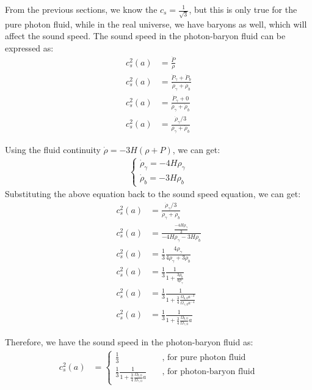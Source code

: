 \clearpage
\begin{foundation}
    From the previous sections, we know the $c_s = \frac{1}{\sqrt{3}}$, but this is only true for the pure photon fluid, while in the real universe, we have baryons as well, which will affect the sound speed. The sound speed in the photon-baryon fluid can be expressed as:
    \begin{align*}
        c_s^2(a) &= \frac{\dot{P}}{\dot{\rho}} \\
        c_s^2(a) &= \frac{\dot{P}_\gamma + \dot{P}_b}{\dot{\rho}_\gamma + \dot{\rho}_b} \\
        c_s^2(a) &= \frac{\dot{P}_\gamma + 0}{\dot{\rho}_\gamma + \dot{\rho}_b} \\
        c_s^2(a) &= \frac{\dot{\rho}_\gamma / 3}{\dot{\rho}_\gamma + \dot{\rho}_b}
    \end{align*}

    Using the fluid continuity $\dot{\rho} = -3 H (\rho + P)$, we can get:
    \begin{align*}
        \begin{cases}
            \dot{\rho}_\gamma = -4 H \rho_\gamma \\
            \dot{\rho}_b = -3 H \rho_b
        \end{cases}
    \end{align*}
    Substituting the above equation back to the sound speed equation, we can get:
    \begin{align*}
        c_s^2(a) &= \frac{\dot{\rho}_\gamma / 3}{\dot{\rho}_\gamma + \dot{\rho}_b} \\
        c_s^2(a) &= \frac{\frac{-4 H \rho_\gamma}{3}}{-4 H \rho_\gamma - 3 H \rho_b} \\
        c_s^2(a) &= \frac{1}{3} \frac{4 \rho_\gamma}{4 \rho_\gamma + 3 \rho_b} \\
        c_s^2(a) &= \frac{1}{3} \frac{1}{1 + \frac{3 \rho_b}{4 \rho_\gamma}} \\
        c_s^2(a) &= \frac{1}{3} \frac{1}{1 + \frac{3}{4} \frac{\Omega_{b,0} a^{-3}}{\Omega_{\gamma,0} a^{-4}}} \\
        c_s^2(a) &= \frac{1}{3} \frac{1}{1 + \frac{3}{4} \frac{\Omega_{b,0}}{\Omega_{\gamma,0}} a}
    \end{align*}

    Therefore, we have the sound speed in the photon-baryon fluid as:
    \begin{align*}
        c_s^2(a) &= \begin{cases}
            \frac{1}{3} & \quad \text{, for pure photon fluid} \\
            \frac{1}{3} \frac{1}{1 + \frac{3}{4} \frac{\Omega_{b,0}}{\Omega_{\gamma,0}} a} & \quad \text{, for photon-baryon fluid}
        \end{cases}
    \end{align*}
\end{foundation}

